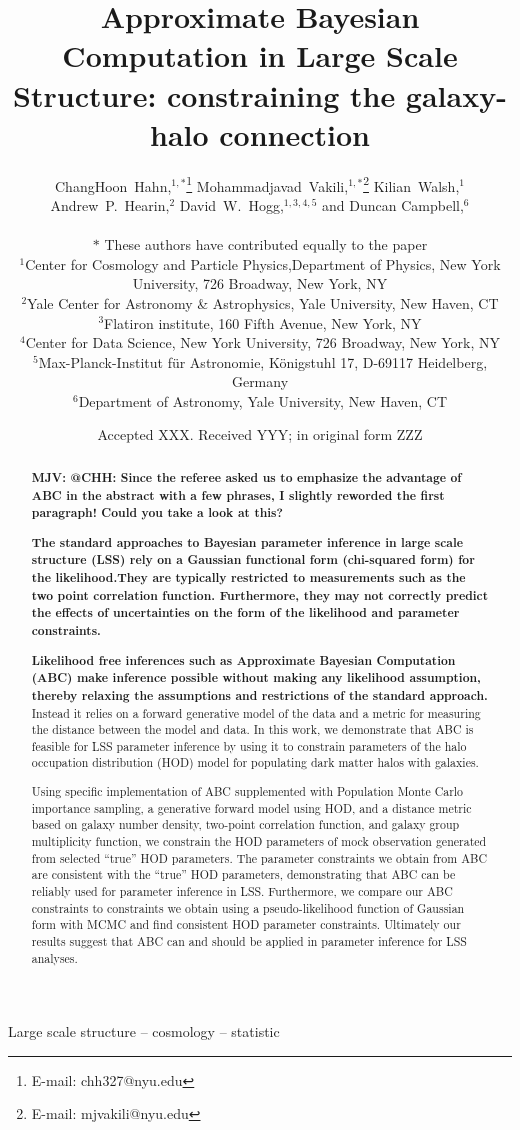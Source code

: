 \documentclass[fleqn,usenatbib]{mnras}
\title[ABC in large scale structure]{Approximate Bayesian Computation in Large Scale Structure: constraining the galaxy-halo connection}
\author[Hahn \& Vakili et al.]{
\parbox{\textwidth}{
ChangHoon~Hahn,$^{1,\ast}$\thanks{E-mail: chh327@nyu.edu}
Mohammadjavad~Vakili,$^{1,\ast}$\thanks{E-mail: mjvakili@nyu.edu}
Kilian~Walsh,$^{1}$\\
Andrew~P.~Hearin,$^{2}$
David~W.~Hogg,$^{1,3,4,5}$
and Duncan Campbell,$^{6}$
}
  \vspace*{10pt} \\
$*$ These authors have contributed equally to the paper\\ 
$^{1}$Center for Cosmology and Particle Physics,Department of Physics, New York University, 726 Broadway, New York, NY\\
$^{2}$Yale Center for Astronomy \& Astrophysics, Yale University, New Haven, CT\\
$^{3}$Flatiron institute, 160 Fifth Avenue, New York, NY\\
$^{4}$Center for Data Science, New York University, 726 Broadway, New York, NY\\
$^{5}$Max-Planck-Institut f\"ur Astronomie, K\"onigstuhl 17, D-69117 Heidelberg, Germany\\
$^{6}$Department of Astronomy, Yale University, New Haven, CT
}
\date{Accepted XXX. Received YYY; in original form ZZZ}
\begin{document}
\label{firstpage}
\pagerange{\pageref{firstpage}--\pageref{lastpage}}
\maketitle

\begin{abstract}
{\bf\color{darkgreen} MJV: @CHH: Since the referee asked us to emphasize the advantage of ABC in the abstract with a few phrases, I slightly reworded the first paragraph! Could you take a look at this?}

{\bf \color{dred}The standard approaches to Bayesian parameter inference in large scale structure (LSS) rely on a Gaussian functional form (chi-squared form) for the likelihood.They are typically restricted to measurements such as the two point correlation function. Furthermore, they may not correctly predict the effects of uncertainties on the form of the likelihood and parameter constraints.}

{\bf \color{dred} Likelihood free inferences such as Approximate Bayesian Computation (ABC) make inference possible without making any likelihood assumption, thereby relaxing the assumptions and restrictions of the standard approach.} Instead it relies on a forward generative model of the data and a metric for measuring the distance between the model and data. In this work, we demonstrate that ABC is feasible for LSS parameter inference by using it to constrain parameters of the halo occupation distribution (HOD) model for populating dark matter halos with galaxies.


Using specific implementation of ABC supplemented with Population Monte Carlo
importance sampling, a generative forward model using HOD, and a distance metric 
based on galaxy number density, two-point correlation function, and galaxy group
multiplicity function, we constrain the HOD parameters of mock observation 
generated from selected ``true'' HOD parameters. The parameter constraints we 
obtain from ABC are consistent with the ``true'' HOD parameters, demonstrating that ABC can be reliably  used for parameter inference in LSS. Furthermore, we compare our ABC constraints to constraints we obtain using a pseudo-likelihood function of Gaussian form with MCMC and find consistent HOD parameter constraints. Ultimately our results suggest that ABC can and should be applied in parameter  inference for LSS analyses. 
\end{abstract}

\begin{keywords}
Large scale structure -- cosmology -- statistic
\end{keywords}
\end{document}
